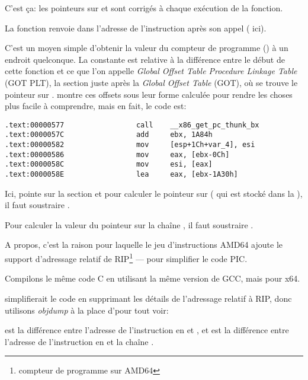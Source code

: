 C'est ça: les pointeurs sur \retstring{} et \globvar{} sont corrigés à chaque exécution de la fonction.

\par La fonction  renvoie dans \EBX l'adresse de l'instruction après son appel ( ici).

C'est un moyen simple d'obtenir la valeur du compteur de programme (\EIP) à un endroit quelconque.
La constante  est relative à la différence entre le début de cette fonction et ce que l'on appelle
\emph{Global Offset Table Procedure Linkage Table} (GOT PLT), la section juste après la \emph{Global Offset Table} (GOT), où se trouve le pointeur sur \globvar{}.
\IDA montre ces offsets sous leur forme calculée pour rendre les choses plus facile à comprendre, mais en fait, le code est:

\begin{lstlisting}[style=customasmx86]
.text:00000577                 call    __x86_get_pc_thunk_bx
.text:0000057C                 add     ebx, 1A84h
.text:00000582                 mov     [esp+1Ch+var_4], esi
.text:00000586                 mov     eax, [ebx-0Ch]
.text:0000058C                 mov     esi, [eax]
.text:0000058E                 lea     eax, [ebx-1A30h]
\end{lstlisting}

Ici, \EBX pointe sur la section  et pour calculer le pointeur sur \globvar{} ( qui est stocké dans
la ), il faut soustraire .

Pour calculer la valeur du pointeur sur la chaîne \retstring{}, il faut soustraire .


A propos, c'est la raison pour laquelle le jeu d'instructions AMD64 ajoute le support d'adressage relatif de RIP\footnote{compteur de programme sur AMD64} --- pour simplifier le code PIC.

Compilons le même code C en utilisant la même version de GCC, mais pour x64.

\IDA simplifierait le code en supprimant les détails de l'adressage relatif à RIP,
donc utilisons \emph{objdump} à la place d'\IDA pour tout voir:



 est la différence entre l'adresse de l'instruction en  et \globvar{}, et 
 est la différence entre l'adresse de l'instruction en
 et la chaîne \retstring{}.


